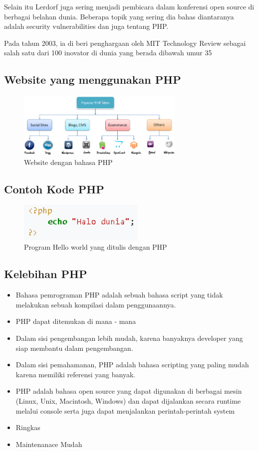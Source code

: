 \begin{enumerate}
Selain itu Lerdorf juga sering menjadi pembicara dalam konferensi open source di berbagai belahan dunia. Beberapa topik yang sering dia bahas diantaranya adalah security vulnerabilities dan juga tentang PHP.

Pada tahun 2003, ia di beri penghargaan oleh MIT Technology Review sebagai salah satu dari 100 inovator di dunia yang berada dibawah umur 35
\subsection{Website yang menggunakan PHP} 
	\begin{figure}[H]
		\includegraphics[width=8cm]{figures/web/popularphpsites.jpg}
		\centering
		\caption{Website dengan bahasa PHP}
	\end{figure}

\subsection{Contoh Kode PHP}
	\begin{figure}[H]
		\includegraphics[width=6cm]{figures/web/contohkodingphp.png}
		\centering
		\caption{Program Hello world yang ditulis dengan PHP}
	\end{figure}

\subsection{Kelebihan PHP}
\begin{itemize}
	\item Bahasa pemrograman PHP adalah sebuah bahasa script yang tidak melakukan sebuah kompilasi dalam penggunaannya.
	\item PHP dapat ditemukan di mana - mana
	\item Dalam sisi pengembangan lebih mudah, karena banyaknya developer yang siap membantu dalam pengembangan.
	\item Dalam sisi pemahamanan, PHP adalah bahasa scripting yang paling mudah karena memiliki referensi yang banyak.
	\item PHP adalah bahasa open source yang dapat digunakan di berbagai mesin (Linux, Unix, Macintosh, Windows) dan dapat dijalankan secara runtime melalui console serta juga dapat menjalankan perintah-perintah system
	\item Ringkas
	\item Maintenanace Mudah
\end{itemize}

\end{enumerate}
